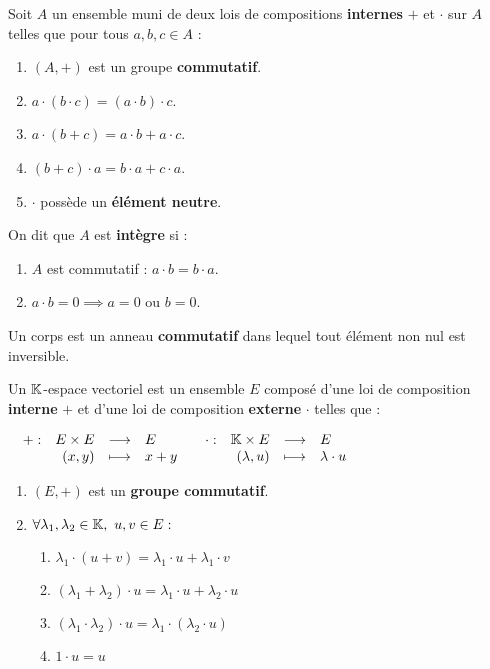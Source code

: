 \begin{definition}
	Soit $A$ un ensemble muni de deux lois de compositions \textbf{internes} \og $+$ \fg et \og $\cdot$ \fg sur $A$ telles que pour tous $a, b, c \in A$ : 
	\begin{enumerate}
			\item $(A, +)$ est un groupe \textbf{commutatif}.
			\item $a \cdot (b \cdot c) = (a \cdot b) \cdot c$.
			\item $a \cdot (b + c) = a \cdot b + a \cdot c$.
			\item $(b + c) \cdot a = b \cdot a + c \cdot a$.
			\item \og $\cdot$ \fg possède un \textbf{élément neutre}.
		\end{enumerate}
	\noindent On dit que $A$ est \textbf{intègre} si :
	\begin{enumerate}
			\item $A$ est commutatif : $a \cdot b = b \cdot a$.
			\item $a \cdot b = 0 \implies a = 0 \text{ ou } b = 0$.
		\end{enumerate}
\end{definition}

\begin{definition}
    Un corps est un anneau \textbf{commutatif} dans lequel tout élément non nul est inversible.
\end{definition}

\begin{definition}
	Un $\mathbb{K}$-espace vectoriel est un ensemble $E$ composé d'une loi de composition \textbf{interne} \og $+$ \fg et d'une loi de composition \textbf{externe} \og $\cdot$ \fg telles que :
	\begin{center}
		$
		\begin{array}{cc}
			\begin{array}{rrcl} + : & E \times E & \longrightarrow & E \\ & (x,y) & \longmapsto & x+y \end{array}
			&
			\begin{array}{rrcl} \cdot : & \mathbb{K} \times E & \longrightarrow & E \\ & (\lambda, u) & \longmapsto & \lambda \cdot u \end{array}
		\end{array}
		$	
	\end{center}		
	
	\begin{enumerate}
		\item $(E, +)$ est un \textbf{groupe commutatif}.
		\item $\forall \lambda_1, \lambda_2 \in \K,\ u, v \in E :$
		\begin{enumerate}
			\item $\lambda_1 \cdot (u + v) = \lambda_1 \cdot u + \lambda_1 \cdot v$
			\item $(\lambda_1 + \lambda_2) \cdot u = \lambda_1 \cdot u + \lambda_2 \cdot u$
			\item $(\lambda_1 \cdot \lambda_2) \cdot u = \lambda_1 \cdot (\lambda_2 \cdot u)$
			\item $1 \cdot u = u$
		\end{enumerate}
	\end{enumerate}
\end{definition}

